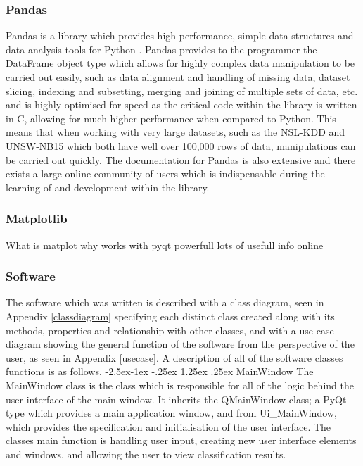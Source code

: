 \documentclass[12pt,a4paper]{article}
\makeatletter
\renewcommand\paragraph{\@startsection{paragraph}{4}{\z@}%
            {-2.5ex\@plus -1ex \@minus -.25ex}%
            {1.25ex \@plus .25ex}%
            {\normalfont\normalsize\bfseries}}
\makeatother
\begin{document}
\subsubsection{Pandas}
Pandas is a library which provides high performance, simple data structures and data analysis tools for Python \parencite{pandas}. Pandas provides to the programmer the DataFrame object type which allows for highly complex data manipulation to be carried out easily, such as data alignment and handling of missing data, dataset slicing, indexing and subsetting, merging and joining of multiple sets of data, etc. and is highly optimised for speed as the critical code within the library is written in C, allowing for much higher performance when compared to Python. This means that when working with very large datasets, such as the NSL-KDD and UNSW-NB15 which both have well over 100,000 rows of data, manipulations can be carried out quickly. The documentation for Pandas is also extensive and there exists a large online community of users which is indispensable during the learning of and development within the library.

\subsubsection{Matplotlib}
What is matplot \parencite{matplotlib}
why
	works with pyqt
	powerfull
	lots of usefull info online
\subsubsection{Software}
The software which was written is described with a class diagram, seen in Appendix \ref{classdiagram} specifying each distinct class created along with its methods, properties and relationship with other classes, and with a use case diagram showing the general function of the software from the perspective of the user, as seen in Appendix \ref{usecase}. A description of all of the software classes functions is as follows.
\paragraph{MainWindow}
The MainWindow class is the class which is responsible for all of the logic behind the user interface of the main window. It inherits the QMainWindow class; a PyQt type which provides a main application window, and from Ui\_MainWindow, which provides the specification and initialisation of the user interface. The classes main function is handling user input, creating new user interface elements and windows, and allowing the user to view classification results.
\end{document}
